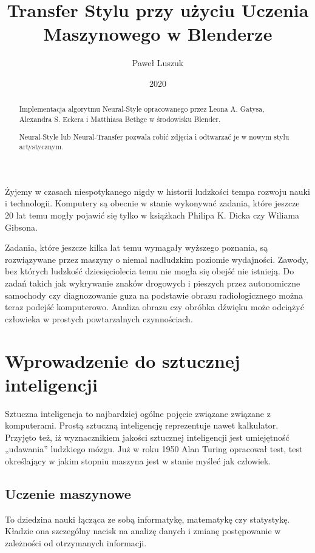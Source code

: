 \documentclass[brudnopis]{xmgr}
\author   {Paweł Luszuk}
\title    {Transfer Stylu przy użyciu Uczenia Maszynowego w Blenderze}
\date     {2020}
\begin{document}
\begin{abstract}
Implementacja algorytmu Neural-Style opracowanego przez Leona A. Gatysa, Alexandra S. Eckera i Matthiasa Bethge w środowisku Blender.

Neural-Style lub Neural-Transfer pozwala robić zdjęcia i odtwarzać je w nowym stylu artystycznym. 
\end{abstract}


\maketitle

\introduction

Żyjemy w czasach niespotykanego nigdy w historii ludzkości tempa rozwoju nauki i technologii. Komputery są obecnie w stanie wykonywać zadania, które jeszcze 20 lat temu mogły pojawić się tylko w książkach Philipa K. Dicka czy Wiliama Gibsona.

Zadania, które jeszcze kilka lat temu wymagały wyższego poznania, są rozwiązywane przez maszyny o niemal nadludzkim poziomie wydajności. Zawody, bez których ludzkość dziesięciolecia temu nie mogła się obejść nie istnieją. Do zadań takich jak wykrywanie znaków drogowych i pieszych przez autonomiczne samochody czy diagnozowanie guza na podstawie obrazu radiologicznego można teraz podejść komputerowo. Analiza obrazu czy obróbka dźwięku może odciążyć człowieka w prostych powtarzalnych czynnościach.


\chapter{Wprowadzenie do sztucznej inteligencji\label{s:dtd}}

Sztuczna inteligencja to najbardziej ogólne pojęcie związane związane z komputerami. Prostą sztuczną inteligencję reprezentuje nawet kalkulator. Przyjęto też, iż wyznacznikiem jakości sztucznej inteligencji jest umiejętność „udawania” ludzkiego mózgu. Już w roku 1950 Alan Turing opracował test, test określający w jakim stopniu maszyna jest w stanie myśleć jak człowiek.

\section{Uczenie maszynowe}

To dziedzina nauki łącząca ze sobą informatykę, matematykę czy statystykę. Kładzie ona szczególny nacisk na analizę danych i zmianę postępowanie w zależności od otrzymanych informacji.
\end{document}
